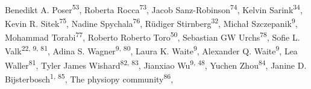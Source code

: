 \documentclass[12pt,a4paper,onecolumn]{article}
\begin{document}
{Benedikt A. Poser\textsuperscript{53}, %
Roberta Rocca\textsuperscript{73}, %
Jacob Sanz-Robinson\textsuperscript{74}, %
Kelvin Sarink\textsuperscript{34}, %
Kevin R. Sitek\textsuperscript{75}, %
Nadine Spychala\textsuperscript{76}, %
Rüdiger Stirnberg\textsuperscript{32}, %
Michał Szczepanik\textsuperscript{9}, %
Mohammad Torabi\textsuperscript{77}, %
Roberto Roberto Toro\textsuperscript{50}, %
Sebastian GW Urchs\textsuperscript{78}, %
Sofie L. Valk\textsuperscript{22, 9, 81}, %
Adina S. Wagner\textsuperscript{9, 80}, %
Laura K. Waite\textsuperscript{9}, %
Alexander Q. Waite\textsuperscript{9}, %
Lea Waller\textsuperscript{81}, %
Tyler James Wishard\textsuperscript{82, 83}, %
Jianxiao Wu\textsuperscript{9, 48}, %
Yuchen Zhou\textsuperscript{84}, %
Janine D. Bijsterbosch\textsuperscript{1, 85}, %
The physiopy community\textsuperscript{86}, %
}
\\
\end{document}
